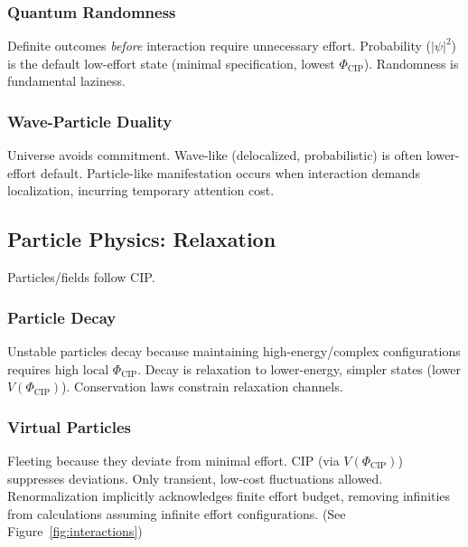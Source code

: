 \documentclass[11pt, a4paper]{article}
\newcommand{\subt}[1]{\mathrm{#1}}
\begin{document}
\subsubsection{Quantum Randomness}
Definite outcomes \textit{before} interaction require unnecessary effort. Probability ($|\psi|^2$) is the default low-effort state (minimal specification, lowest $\Phi_{\subt{CIP}}$). Randomness is fundamental laziness.

\subsubsection{Wave-Particle Duality}
Universe avoids commitment. Wave-like (delocalized, probabilistic) is often lower-effort default. Particle-like manifestation occurs when interaction demands localization, incurring temporary attention cost.

\subsection{Particle Physics: Relaxation}

Particles/fields follow CIP.

\subsubsection{Particle Decay}
Unstable particles decay because maintaining high-energy/complex configurations requires high local $\Phi_{\subt{CIP}}$. Decay is relaxation to lower-energy, simpler states (lower $V(\Phi_{\subt{CIP}})$). Conservation laws constrain relaxation channels.

\subsubsection{Virtual Particles}
Fleeting because they deviate from minimal effort. CIP (via $V(\Phi_{\subt{CIP}})$) suppresses deviations. Only transient, low-cost fluctuations allowed. Renormalization implicitly acknowledges finite effort budget, removing infinities from calculations assuming infinite effort configurations. (See Figure~\ref{fig:interactions})
\end{document}
